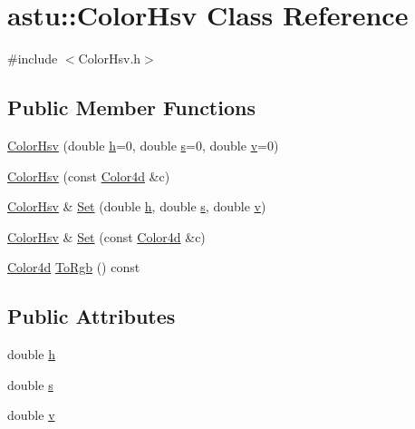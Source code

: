 \hypertarget{classastu_1_1ColorHsv}{}\section{astu\+:\+:Color\+Hsv Class Reference}
\label{classastu_1_1ColorHsv}


{\ttfamily \#include $<$Color\+Hsv.\+h$>$}

\subsection*{Public Member Functions}
\begin{DoxyCompactItemize}
\item 
\hyperlink{classastu_1_1ColorHsv_ab19f575051a7b2a5ddb1a5033adff845}{Color\+Hsv} (double \hyperlink{classastu_1_1ColorHsv_a4622776730a1656b8fa078d302243ec0}{h}=0, double \hyperlink{classastu_1_1ColorHsv_a4935b897136129b2ec75bebd437d227e}{s}=0, double \hyperlink{classastu_1_1ColorHsv_a05e185fc6498318cb461941a8ca40ec2}{v}=0)
\item 
\hyperlink{classastu_1_1ColorHsv_a8ef91414fc6a68539ece9953ebf6124d}{Color\+Hsv} (const \hyperlink{classastu_1_1Color}{Color4d} \&c)
\item 
\hyperlink{classastu_1_1ColorHsv}{Color\+Hsv} \& \hyperlink{classastu_1_1ColorHsv_aa42f86bf03a392ff274d1a1f0ec92ca0}{Set} (double \hyperlink{classastu_1_1ColorHsv_a4622776730a1656b8fa078d302243ec0}{h}, double \hyperlink{classastu_1_1ColorHsv_a4935b897136129b2ec75bebd437d227e}{s}, double \hyperlink{classastu_1_1ColorHsv_a05e185fc6498318cb461941a8ca40ec2}{v})
\item 
\hyperlink{classastu_1_1ColorHsv}{Color\+Hsv} \& \hyperlink{classastu_1_1ColorHsv_a5ff673f9c2ad37aac3dcda76e5bf1f94}{Set} (const \hyperlink{classastu_1_1Color}{Color4d} \&c)
\item 
\hyperlink{classastu_1_1Color}{Color4d} \hyperlink{classastu_1_1ColorHsv_a296b1f9beccd3c5b34d84f8b3fc83375}{To\+Rgb} () const
\end{DoxyCompactItemize}
\subsection*{Public Attributes}
\begin{DoxyCompactItemize}
\item 
double \hyperlink{classastu_1_1ColorHsv_a4622776730a1656b8fa078d302243ec0}{h}
\item 
double \hyperlink{classastu_1_1ColorHsv_a4935b897136129b2ec75bebd437d227e}{s}
\item 
double \hyperlink{classastu_1_1ColorHsv_a05e185fc6498318cb461941a8ca40ec2}{v}
\end{DoxyCompactItemize}


